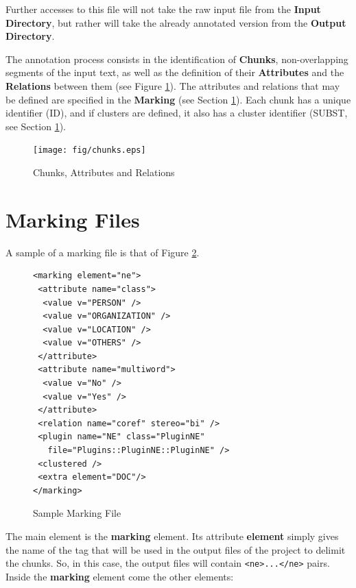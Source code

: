 \documentclass{article}
\begin{document}
Further accesses to this file will not take the raw input file from
the \textbf{Input Directory}, but rather will take the already
annotated version from the \textbf{Output Directory}.

The annotation process consists in the identification of
\textbf{Chunks}, non-overlapping segments of the input text, as well
as the definition of their \textbf{Attributes} and the
\textbf{Relations} between them (see Figure \ref{fig:chunks}). The
attributes and relations that may be defined are specified in the
\textbf{Marking} (see Section \ref{sec:marking}). Each chunk has a
unique identifier (ID), and if clusters are defined, it also has a
cluster identifier (SUBST, see Section \ref{sec:marking}).

\begin{figure}[ht]
\begin{center}

\texttt{[image: fig/chunks.eps]}

\caption{Chunks, Attributes and Relations}
\label{fig:chunks}
\end{center}
\end{figure}

\section{Marking Files}
\label{sec:marking}
A sample of a marking file is that of Figure \ref{fig:marking}.

\begin{figure}[ht]

\begin{center}
\begin{minipage}{80mm}
\begin{verbatim}
<marking element="ne">
 <attribute name="class">
  <value v="PERSON" />
  <value v="ORGANIZATION" />
  <value v="LOCATION" />
  <value v="OTHERS" />
 </attribute>
 <attribute name="multiword">
  <value v="No" />
  <value v="Yes" />
 </attribute>
 <relation name="coref" stereo="bi" />
 <plugin name="NE" class="PluginNE"
   file="Plugins::PluginNE::PluginNE" />
 <clustered />
 <extra element="DOC"/>
</marking>
\end{verbatim}
\end{minipage}

\caption{Sample Marking File}
\label{fig:marking}
\end{center}
\end{figure}

The main element is the \textbf{marking} element. Its attribute
\textbf{element} simply gives the name of the tag that will be used in
the output files of the project to delimit the chunks. So, in this
case, the output files will contain \verb|<ne>...</ne>| pairs. Inside
the \textbf{marking} element come the other elements:
\end{document}
